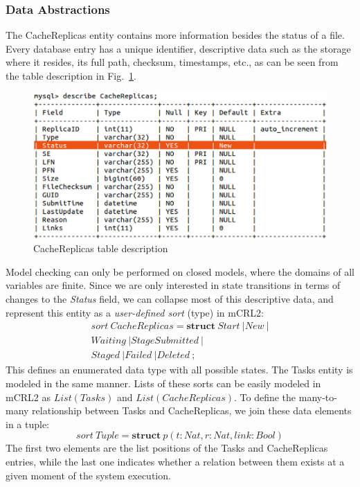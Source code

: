 \documentclass[sort&compress,preprint,3p]{elsarticle}
\begin{document}
\subsubsection{Data Abstractions}
The CacheReplicas entity contains more information besides the status of a file.
Every database entry has a unique identifier, descriptive data such as 
the storage where it resides, its full path, checksum, timestamps, etc., as can be seen
from the table description in Fig.~\ref{fig:CacheReplicasTable}.
\begin{figure}[bp!]
\begin{center}
 \includegraphics[width=0.5\linewidth,keepaspectratio=true]{./Figure5.png}
\end{center}
\caption{CacheReplicas table description}
\label{fig:CacheReplicasTable}
\end{figure}
Model checking can only be performed on closed models, where the domains
of all variables are finite. Since we are only interested in state transitions in terms of 
changes to the \textit{Status} field,
we can collapse most of this descriptive data, and represent this entity as a 
\textit{user-defined sort} (type) in mCRL2:
\begin{displaymath}
\begin{aligned}
sort\ CacheReplicas = \textbf{struct}\ Start\ | 
			  New\ |  \\
		    Waiting\ | 
          StageSubmitted\ | \\
		      Staged\ | 
		      Failed\ | 
		  Deleted\ ;
\end{aligned}
\end{displaymath}
This defines an enumerated data type with all possible states.
The Tasks entity is modeled in the same manner. Lists of these sorts can be easily modeled 
in mCRL2 as \begin{math}List(Tasks) \end{math} and 
\begin{math}List(CacheReplicas) \end{math}.
To define the many-to-many relationship between Tasks and CacheReplicas,
we join these data elements in a tuple:
\begin{displaymath}sort \ Tuple = \textbf{struct}\ p(t:Nat,r:Nat,link:Bool)
\end{displaymath}
The first two elements are the list positions of the Tasks and CacheReplicas
entries, while the last one indicates whether a relation between
them exists at a given moment of the system execution. 
\end{document}

